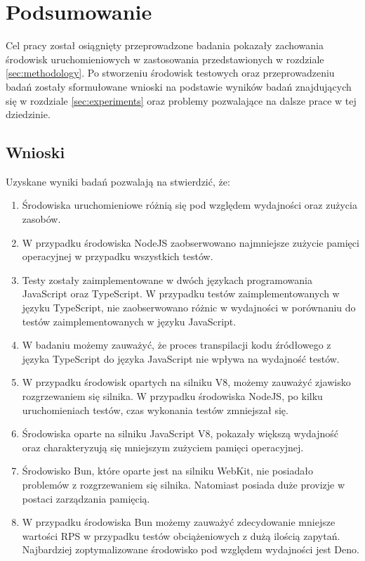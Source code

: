 \section{Podsumowanie}
Cel pracy został osiągnięty przeprowadzone badania pokazały zachowania środowisk uruchomieniowych w zastosowania przedstawionych w rozdziale \ref{sec:methodology}. Po stworzeniu środowisk testowych oraz przeprowadzeniu badań zostały sformułowane wnioski na podstawie wyników badań znajdujących się w rozdziale \ref{sec:experiments} oraz problemy pozwalające na dalsze prace w tej dziedzinie.

\subsection{Wnioski}
Uzyskane wyniki badań pozwalają na stwierdzić, że:
\begin{enumerate}
  \item Środowiska uruchomieniowe różnią się pod względem wydajności oraz zużycia zasobów. 
  \item W przypadku środowiska NodeJS zaobserwowano najmniejsze zużycie pamięci operacyjnej w przypadku wszystkich testów.
  \item Testy zostały zaimplementowane w dwóch językach programowania JavaScript oraz TypeScript. W przypadku testów zaimplementowanych w języku TypeScript, nie zaobserwowano różnic w wydajności w porównaniu do testów zaimplementowanych w języku JavaScript.
  \item W badaniu możemy zauważyć, że proces transpilacji kodu źródłowego z języka TypeScript do języka JavaScript nie wpływa na wydajność testów.
  \item W przypadku środowisk opartych na silniku V8, możemy zauważyć zjawisko rozgrzewaniem się silnika. W przypadku środowiska NodeJS, po kilku uruchomieniach testów, czas wykonania testów zmniejszał się.
  \item Środowiska oparte na silniku JavaScript V8, pokazały większą wydajność oraz charakteryzują się mniejszym zużyciem pamięci operacyjnej.
  \item Środowisko Bun, które oparte jest na silniku WebKit, nie posiadało problemów z rozgrzewaniem się silnika. Natomiast posiada duże provizje w postaci zarządzania pamięcią.
  \item W przypadku środowiska Bun możemy zauważyć zdecydowanie mniejsze wartości RPS w przypadku testów obciążeniowych z dużą ilością zapytań. Najbardziej zoptymalizowane środowisko pod względem wydajności jest Deno.
\end{enumerate}

